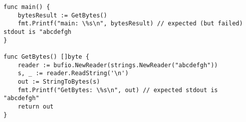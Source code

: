 \begin{lstlisting}[language=Golang, label=lst:architecture-dependent-types-cast, caption=Incorrect cast between architecture-dependent types]
func main() {
    bytesResult := GetBytes()
    fmt.Printf("main: \%s\n", bytesResult) // expected (but failed) stdout is "abcdefgh
}

func GetBytes() []byte {
    reader := bufio.NewReader(strings.NewReader("abcdefgh"))
    s, _ := reader.ReadString('\n')
    out := StringToBytes(s)
    fmt.Printf("GetBytes: \%s\n", out) // expected stdout is "abcdefgh"
    return out
}
\end{lstlisting}